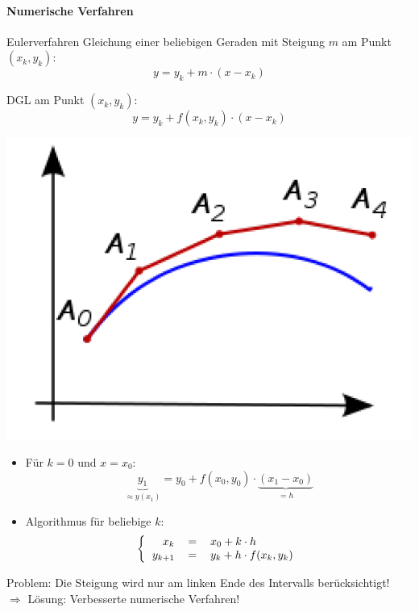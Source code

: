 \paragraph{Numerische Verfahren}
\begin{definition}{Eulerverfahren}
  Gleichung einer beliebigen Geraden mit Steigung \(m\) am Punkt \((x_k,y_k)\):
      \[y=y_k+m\cdot(x-x_k)\]
    \begin{minipage}{0.5\linewidth}
      DGL am Punkt \((x_k,y_k)\):
      \[y=y_k+f(x_k,y_k)\cdot (x-x_k)\]
    \end{minipage}
    \begin{minipage}{0.45\linewidth}
      \begin{center}
        \includegraphics[width=0.7\linewidth]{images/Newtonverfahren.png}
        \end{center}
    \end{minipage}
  \begin{itemize}

    \item Für \(k=0 \text{ und } x=x_0\):
      \[\underbrace{y_1}_{\approx y(x_1)}=y_0+f(x_0,y_0)\cdot\underbrace{(x_1-x_0)}_{=h}\]
    \item Algorithmus für beliebige \(k\):
      \[\left\{\begin{tabular}{rcl}
	  \(x_k\)&\(=\)&\(x_0+k\cdot h\)\\
	  \(y_{k+1}\)&\(=\)&\(y_k+h\cdot f(x_k,y_k)\)
	\end{tabular}
      \right.\]
  \end{itemize}
  Problem: Die Steigung wird nur am linken Ende des Intervalls berücksichtigt!
    \\ $\Rightarrow$ Lösung: Verbesserte numerische Verfahren!
\end{definition}

